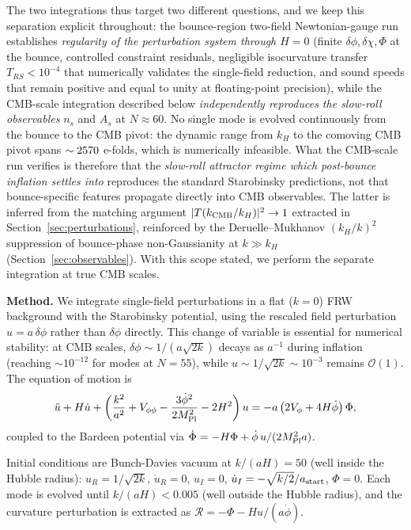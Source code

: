 \documentclass[11pt,a4paper]{article}
\begin{document}
The two integrations thus target two different questions, and we keep this separation explicit throughout: the bounce-region two-field Newtonian-gauge run establishes \emph{regularity of the perturbation system through $H = 0$} (finite $\delta\phi, \delta\chi, \Phi$ at the bounce, controlled constraint residuals, negligible isocurvature transfer $T_{RS} < 10^{-4}$ that numerically validates the single-field reduction, and sound speeds that remain positive and equal to unity at floating-point precision), while the CMB-scale integration described below \emph{independently reproduces the slow-roll observables} $n_s$ and $A_s$ at $N \approx 60$.  No single mode is evolved continuously from the bounce to the CMB pivot: the dynamic range from $k_H$ to the comoving CMB pivot spans $\sim 2570$ e-folds, which is numerically infeasible.  What the CMB-scale run verifies is therefore that the \emph{slow-roll attractor regime which post-bounce inflation settles into} reproduces the standard Starobinsky predictions, not that bounce-specific features propagate directly into CMB observables.  The latter is inferred from the matching argument $|T(k_{\rm CMB}/k_H)|^2 \to 1$ extracted in Section~\ref{sec:perturbations}, reinforced by the Deruelle--Mukhanov $(k_H/k)^2$ suppression of bounce-phase non-Gaussianity at $k \gg k_H$ (Section~\ref{sec:observables}).  With this scope stated, we perform the separate integration at true CMB scales.

\textbf{Method.} We integrate single-field perturbations in a flat ($k=0$) FRW background with the Starobinsky potential, using the rescaled field perturbation $u = a\,\delta\phi$ rather than $\delta\phi$ directly. This change of variable is essential for numerical stability: at CMB scales, $\delta\phi \sim 1/(a\sqrt{2k})$ decays as $a^{-1}$ during inflation (reaching $\sim 10^{-12}$ for modes at $N = 55$), while $u \sim 1/\sqrt{2k} \sim 10^{-3}$ remains $\mathcal{O}(1)$. The equation of motion is
\begin{equation}
\ddot{u} + H\dot{u} + \left(\frac{k^2}{a^2} + V_{\phi\phi} - \frac{3\dot\phi^2}{2M_{\rm Pl}^2} - 2H^2\right) u = -a\left(2V_\phi + 4H\dot\phi\right)\Phi,
\label{eq:ms_eom}
\end{equation}
coupled to the Bardeen potential via $\dot\Phi = -H\Phi + \dot\phi\,u/(2M_{\rm Pl}^2 a)$.

Initial conditions are Bunch-Davies vacuum at $k/(aH) = 50$ (well inside the Hubble radius): $u_R = 1/\sqrt{2k}$, $\dot{u}_R = 0$, $u_I = 0$, $\dot{u}_I = -\sqrt{k/2}/a_{\rm start}$, $\Phi = 0$. Each mode is evolved until $k/(aH) < 0.005$ (well outside the Hubble radius), and the curvature perturbation is extracted as $\mathcal{R} = -\Phi - Hu/(a\dot\phi)$.
\end{document}
